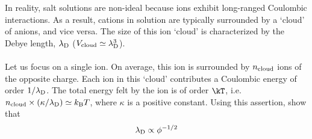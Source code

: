 \smallskip \subp
In reality, salt solutions are non-ideal because
ions exhibit long-ranged Coulombic interactions.
As a result, cations in solution 
are typically surrounded by a `cloud' of anions, and vice versa. 
The size of this ion `cloud' is characterized 
by the Debye length, $\lambda_{\rm D}$
($V_{\rm cloud} \simeq \lambda_{\rm D}^3$).
\\ \\
Let us focus on a single ion.
On average, this ion is surrounded by $n_{\rm cloud}$ ions
of the opposite charge.
Each ion in this `cloud' contributes a Coulombic energy
of order $1 / \lambda_{\rm D}$. 
The total energy felt by the ion is of order $\kT$,
i.e. $n_{\rm cloud} \times (\kappa / \lambda_{\rm D}) \simeq k_{\rm B} T$,
where $\kappa$ is a positive constant.
Using this assertion, show that
\[ \lambda_{\rm D} \propto \phi^{-1/2} \]


